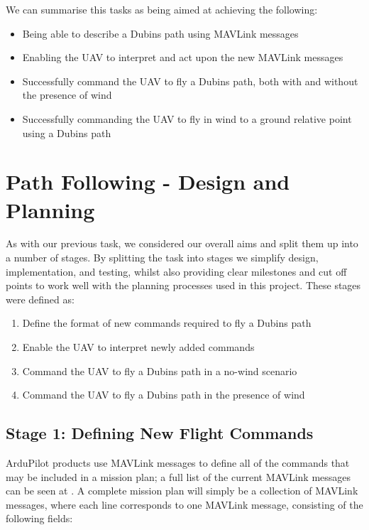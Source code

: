 We can summarise this tasks as being aimed at achieving the following:

\begin{itemize}
	\item Being able to describe a Dubins path using MAVLink messages %
	\item Enabling the UAV to interpret and act upon the new MAVLink messages
	\item Successfully command the UAV to fly a Dubins path, both with and without the presence of wind
	\item Successfully commanding the UAV to fly in wind to a ground relative point using a Dubins path 
\end{itemize}


\section{Path Following - Design and Planning}
\label{task2:design}

As with our previous task, we considered our overall aims and split them up into a number of stages. By splitting the task into stages we simplify design, implementation, and testing, whilst also providing clear milestones and cut off points to work well with the planning processes used in this project. These stages were defined as:

\begin{enumerate}
	\item Define the format of new commands required to fly a Dubins path
	\item Enable the UAV to interpret newly added commands
	\item Command the UAV to fly a Dubins path in a no-wind scenario
	\item Command the UAV to fly a Dubins path in the presence of wind
\end{enumerate}

\subsection{Stage 1: Defining New Flight Commands}
\label{task2:design:stage1}

ArduPilot products use MAVLink messages to define all of the commands that may be included in a mission plan; a full list of the current MAVLink messages can be seen at \cite{MavlinkMessages}. A complete mission plan will simply be a collection of MAVLink messages, where each line corresponds to one MAVLink message, consisting of the following fields:

